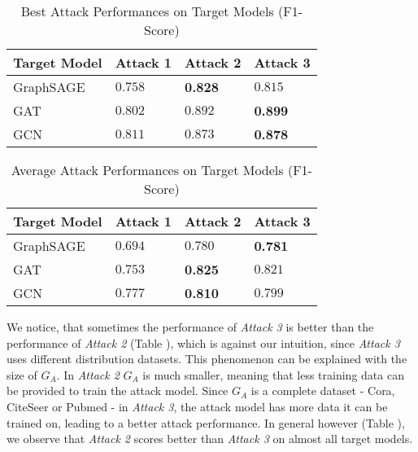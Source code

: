         \vspace{0.48cm}
        \begin{table}[!h]
            \centering
            \footnotesize
            \begin{tabular}{l|l|l|l|}
                \toprule
                Target Model & Attack 1 & Attack 2 & Attack 3 \\
                \midrule
                GraphSAGE & $0.758$ & \textbf{0.828} & $0.815$ \\
                GAT & $0.802$ & $0.892$ & \textbf{0.899} \\
                GCN & $0.811$ & $0.873$ & \textbf{0.878} \\
                
                \bottomrule
            \end{tabular}
            \caption{Best Attack Performances on Target Models (F1-Score)}
            \label{table:attack-best-results-all}
          \end{table}
        
        \vspace{0.48cm}
        \begin{table}[!h]
            \centering
            \footnotesize
            \begin{tabular}{l|l|l|l|}
                \toprule
                Target Model & Attack 1 & Attack 2 & Attack 3 \\
                \midrule
                GraphSAGE & $0.694$ & $0.780$ & \textbf{0.781} \\
                GAT & $0.753$ & \textbf{0.825} & $0.821$ \\
                GCN & $0.777$ & \textbf{0.810} & $0.799$ \\
                
                \bottomrule
            \end{tabular}
            \caption{Average Attack Performances on Target Models (F1-Score)}
            \label{table:attack-avg-results-all}
        \end{table}
    
    We notice, that sometimes the performance of \emph{Attack 3} is better than the performance of \emph{Attack 2} (Table ), which is against our intuition, since \emph{Attack 3} uses different distribution datasets.
    This phenomenon can be explained with the size of $G_A$.
    In \emph{Attack 2} $G_A$ is much smaller, meaning that less training data can be provided to train the attack model.
    Since $G_A$ is a complete dataset - Cora, CiteSeer or Pubmed - in \emph{Attack 3}, the attack model has more data it can be trained on, leading to a better attack performance.
    In general however (Table ), we observe that \emph{Attack 2} scores better than \emph{Attack 3} on almost all target models.

